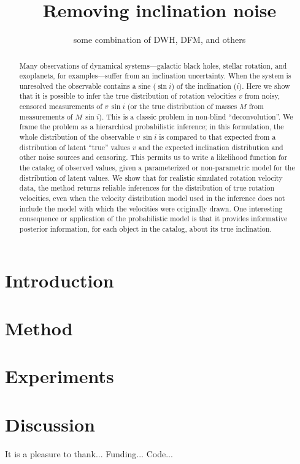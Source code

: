 \documentclass[12pt, preprint]{aastex}
\begin{document}
\title{Removing inclination noise}
\author{some combination of DWH, DFM, and others}
\date{}

\begin{abstract}
Many observations of dynamical systems---galactic black holes, stellar
rotation, and exoplanets, for examples---suffer from an inclination
uncertainty.
When the system is unresolved the observable contains a sine ($\sin
i$) of the inclination ($i$).
Here we show that it is possible to infer the true distribution of
rotation velocities $v$ from noisy, censored measurements of $v\,\sin
i$ (or the true distribution of masses $M$ from measurements of
$M\,\sin i$).
This is a classic problem in non-blind ``deconvolution''.
We frame the problem as a hierarchical probabilistic inference; in
this formulation, the whole distribution of the observable $v\,\sin i$
is compared to that expected from a distribution of latent ``true''
values $v$ and the expected inclination distribution and other noise
sources and censoring.
This permits us to write a likelihood function for the catalog of
observed values, given a parameterized or non-parametric model for the
distribution of latent values.
We show that for realistic simulated rotation velocity data, the
method returns reliable inferences for the distribution of true
rotation velocities, even when the velocity distribution model used in
the inference does not include the model with which the velocities
were originally drawn.
One interesting consequence or application of the probabilistic model
is that it provides informative posterior information, for each object
in the catalog, about its true inclination.
\end{abstract}

\section{Introduction}

\section{Method}

\section{Experiments}

\section{Discussion}

\acknowledgements
It is a pleasure to thank...
Funding...
Code...
\end{document}
